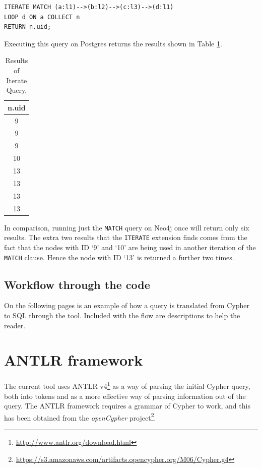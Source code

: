 \documentclass[letterpaper]{ltxdoc}
\begin{document}
\begin{lstlisting}[language = Cypher]
ITERATE MATCH (a:l1)-->(b:l2)-->(c:l3)-->(d:l1)
LOOP d ON a COLLECT n
RETURN n.uid;
\end{lstlisting}

Executing this query on Postgres returns the results shown in Table \ref{table:queryIter}.

\begin{table}[!h]
\caption{Results of Iterate Query.} %
\centering %
\begin{tabular}{c} %
\hline\hline %
n.uid \\ [0.5ex] %
\hline %
9 \\
9 \\
9 \\
10 \\
13 \\
13 \\
13 \\
13 \\ [1ex] %
\hline %
\end{tabular}
\label{table:queryIter} %
\end{table}

In comparison, running just the \texttt{MATCH} query on Neo4j once will return only six results. The extra two results that the \texttt{ITERATE} extension finds comes from the fact that the nodes with ID `9' and `10' are being used in another iteration of the \texttt{MATCH} clause. Hence the node with ID `13' is returned a further two times.

\subsection{Workflow through the code}
\label{ssec:workflow}
On the following pages is an example of how a query is translated from Cypher to SQL through the tool. Included with the flow are descriptions to help the reader.

\newpage



\section{ANTLR framework}
\label{sec:antlr}
The current tool uses ANTLR v4\footnote{\url{http://www.antlr.org/download.html}} as a way of parsing the initial Cypher query, both into tokens and as a more effective way of parsing information out of the query. The ANTLR framework requires a grammar of Cypher to work, and this has been obtained from the \emph{openCypher} project\footnote{\url{https://s3.amazonaws.com/artifacts.opencypher.org/M06/Cypher.g4}}.
\end{document}
